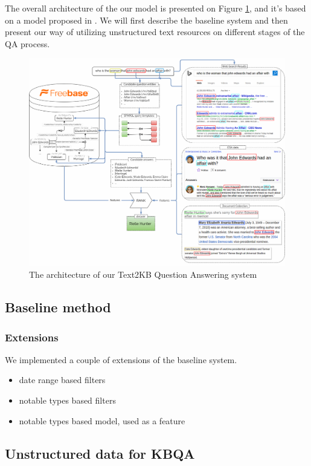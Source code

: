 
The overall architecture of the our model is presented on Figure \ref{fig:model}, and it's based on a model proposed in \cite{ACCU:2015}.
We will first describe the baseline system and then present our way of utilizing unstructured text resources on different stages of the QA process.

\begin{figure}[t]
\centering
\includegraphics[width=\textwidth]{img/Text2KB_model}
\caption{The architecture of our Text2KB Question Answering system}
\label{fig:model}
\end{figure}

\subsection{Baseline method}

\subsubsection{Extensions}
We implemented a couple of extensions of the baseline system.

\begin{itemize}
\item date range based filters
\item notable types based filters
\item notable types based model, used as a feature
\end{itemize}

\subsection{Unstructured data for KBQA}

